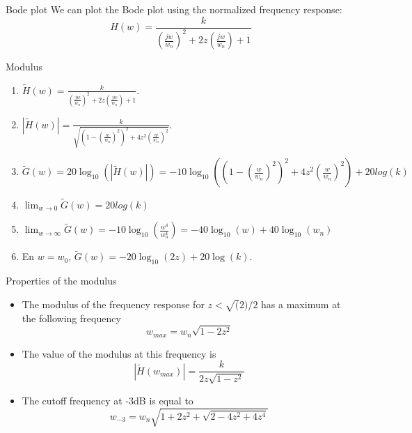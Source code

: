       \begin{block}{Bode plot}
        We can plot the Bode plot using the normalized frequency response:
    \begin{equation}
      \label{eq:transfsecondordre2}
      H(w)=\frac{k}{\left(\frac{jw}{w_n}\right)^2+2z\left(\frac{jw}{w_n}\right)+1}
    \end{equation}
    \vspace{-5mm}
    \begin{block}{Modulus}
    \pause
    \small
      \begin{enumerate}
    \item $ \tilde  H(w)=\frac{k}{\left(\frac{jw}{w_n}\right)^2+2z\left(\frac{jw}{w_n}\right)+1}$.
    \item  $|\tilde H(w)|=\frac{k}{\sqrt{\left(1-\left(\frac{w}{w_n}\right)^2\right)^2+4z^2\left(\frac{w}{w_n}\right)^2}}$.
    \item  $\tilde G(w)=20\log_{10}(|\tilde H(w)|)=-10\log_{10}\left(\left(1-\left(\frac{w}{w_n}\right)^2\right)^2+4z^2\left(\frac{w}{w_n}\right)^2\right)+20log(k)$
    \item $\lim_{w\rightarrow 0}
    \tilde  G(w)=20log(k)$
    \item 
      $\lim_{w\rightarrow\infty} \tilde G(w)=-10\log_{10}(\frac{w^4}{w_n^4})=-40\log_{10}(w)+40\log_{10}(w_n)$
    \item En $w=w_0$, $\tilde G(w)=-20\log_{10}(2z)+20\log(k)$.
    \end{enumerate}
    \end{block}
      \end{block}

      \begin{block}{Properties of the modulus}
        \begin{itemize}
        \item The modulus of the frequency response for  $z<\sqrt(2)/2$ has a maximum at the following frequency
    \begin{equation*}
      w_{max}=w_n\sqrt{1-2z^2}
    \end{equation*}
    \item The value of the modulus at this frequency is
    \begin{equation*}
      |\tilde H(w_{max})|=\frac{k}{2z\sqrt{1-z^2}}
    \end{equation*}
    
    \item The cutoff frequency at -3dB is equal to
    \begin{equation*}
      w_{-3}=w_n\sqrt{1+2z^2+\sqrt{2-4z^2+4z^4}}
    \end{equation*}
    \end{itemize}
    
      \end{block}


